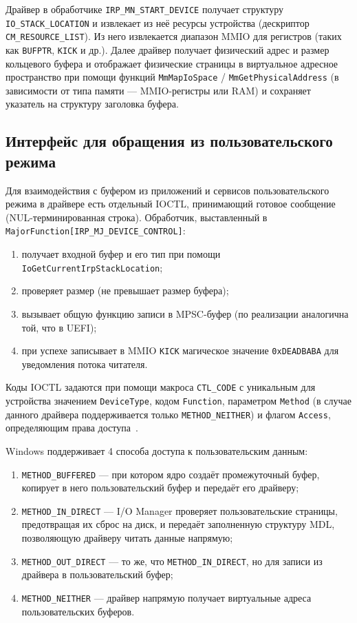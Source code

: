 Драйвер в обработчике \texttt{IRP\_MN\_START\_DEVICE} получает структуру \\ \texttt{IO\_STACK\_LOCATION} и извлекает из неё ресурсы устройства (дескриптор \\ \texttt{CM\_RESOURCE\_LIST}). Из него извлекается диапазон MMIO для
регистров (таких как \texttt{BUFPTR}, \texttt{KICK} и др.).
Далее драйвер получает физический адрес и размер кольцевого буфера и отображает физические страницы в виртуальное адресное пространство при помощи функций \texttt{MmMapIoSpace} / \texttt{MmGetPhysicalAddress} (в зависимости от типа памяти --- MMIO-регистры или RAM) и сохраняет указатель на структуру заголовка буфера.

\subsection{Интерфейс для обращения из пользовательского режима}

Для взаимодействия с буфером из приложений и сервисов пользовательского режима в драйвере есть отдельный IOCTL, принимающий готовое сообщение (NUL-терминированная строка).
Обработчик, выставленный в \texttt{MajorFunction[IRP\_MJ\_DEVICE\_CONTROL]}:
\begin{enumerate}
    \item получает входной буфер и его тип при помощи \texttt{IoGetCurrentIrpStackLocation};
    \item проверяет размер (не превышает размер буфера);
    \item вызывает общую функцию записи в MPSC-буфер (по реализации аналогична той, что в UEFI);
    \item при успехе записывает в MMIO \texttt{KICK} магическое значение \texttt{0xDEADBABA} для уведомления потока читателя.
\end{enumerate}

Коды IOCTL задаются при помощи макроса \texttt{CTL\_CODE} с уникальным для устройства значением \texttt{DeviceType}, кодом \texttt{Function}, параметром \texttt{Method} (в случае данного драйвера поддерживается только \texttt{METHOD\_NEITHER}) и флагом \texttt{Access}, определяющим права доступа~\cite{windows_wdk}.

Windows поддерживает 4 способа доступа к пользовательским данным:
\begin{enumerate}
    \item \texttt{METHOD\_BUFFERED} --- при котором ядро создаёт промежуточный буфер, копирует в него пользовательский буфер и передаёт его драйверу;
    \item \texttt{METHOD\_IN\_DIRECT} --- I/O Manager проверяет пользовательские страницы, \\ предотвращая их сброс на диск, и передаёт заполненную структуру MDL, позволяющую драйверу читать данные напрямую;
    \item \texttt{METHOD\_OUT\_DIRECT} --- то же, что \texttt{METHOD\_IN\_DIRECT}, но для записи из драйвера в пользовательский буфер;
    \item \texttt{METHOD\_NEITHER} --- драйвер напрямую получает виртуальные адреса пользовательских буферов.
\end{enumerate}

